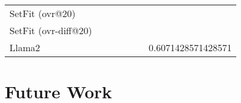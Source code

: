 \documentclass[11pt,letterpaper]{article}
\begin{document}
\begin{table}[h]
\begin{tabular}{l|n{1}{4}n{1}{4}n{1}{4}n{1}{4}n{1}{4}n{1}{4}}
    SetFit (ovr@20)                                                                                                                                                                                                    \\
    SetFit (ovr-diff@20)                                                                                                                                                                                               \\
    Llama2                  &                                &                                &                                &                                 &                                & 0.6071428571428571 \\
    \bottomrule
  \end{tabular}
\end{table}

\section{Future Work}
\end{document}
